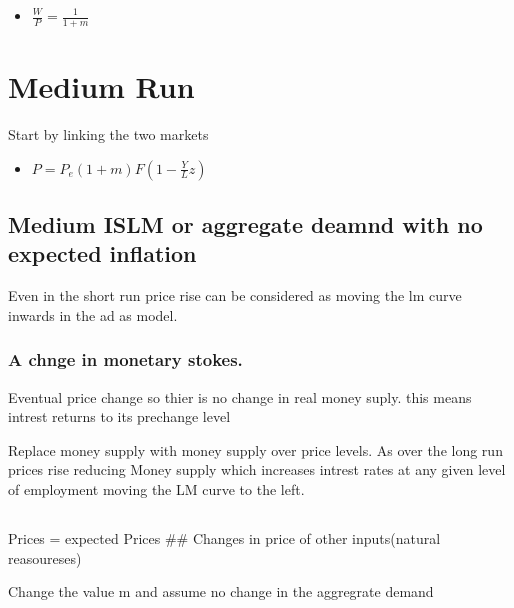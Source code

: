 \documentclass[,twocolumn]{article}
\providecommand{\tightlist}{%
  \setlength{\itemsep}{0pt}\setlength{\parskip}{0pt}}
\begin{document}
\begin{itemize}
\tightlist
\item
  \(\frac{W}{P} =\frac{1}{1+m}\)
\end{itemize}

\hypertarget{medium-run}{%
\section{Medium Run}\label{medium-run}}

Start by linking the two markets

\begin{itemize}
\tightlist
\item
  \(P = P_e(1+m) F(1-\frac{Y}{L}z)\)
\end{itemize}

\hypertarget{medium-islm-or-aggregate-deamnd-with-no-expected-inflation}{%
\subsection{Medium ISLM or aggregate deamnd with no expected
inflation}\label{medium-islm-or-aggregate-deamnd-with-no-expected-inflation}}

Even in the short run price rise can be considered as moving the lm
curve inwards in the ad as model.

\hypertarget{a-chnge-in-monetary-stokes.}{%
\subsubsection{A chnge in monetary
stokes.}\label{a-chnge-in-monetary-stokes.}}

Eventual price change so thier is no change in real money suply. this
means intrest returns to its prechange level

Replace money supply with money supply over price levels. As over the
long run prices rise reducing Money supply which increases intrest rates
at any given level of employment moving the LM curve to the left.

\hypertarget{section}{%
\subsection{}\label{section}}

Prices = expected Prices \#\# Changes in price of other inputs(natural
reasoureses)

Change the value m and assume no change in the aggregrate demand
\end{document}
